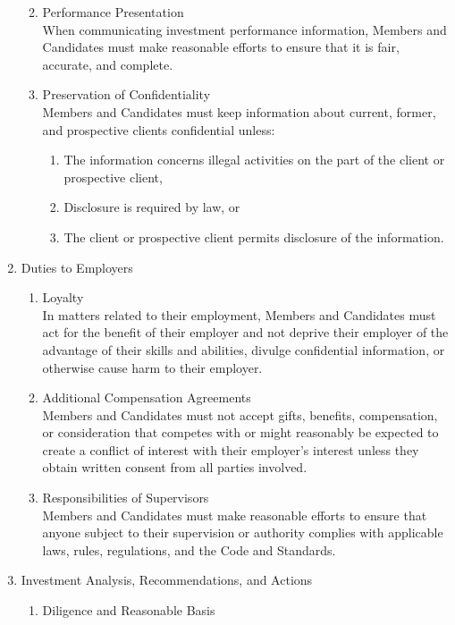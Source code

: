 \begin{definition}
\begin{enumerate}[label=\Roman*.]
\begin{enumerate}[label=\Alph*.]
\begin{enumerate}[label=\arabic*.]
\end{enumerate}
\item Performance Presentation\\
When communicating investment performance information, Members and Candidates must make reasonable efforts to ensure that it is fair, accurate, and complete.
\item Preservation of Confidentiality\\
Members and Candidates must keep information about current, former, and prospective clients confidential unless:
\begin{enumerate}[label=\arabic*.]
\setlength{\itemsep}{0pt}
\item The information concerns illegal activities on the part of the client or prospective client,
\item Disclosure is required by law, or
\item The client or prospective client permits disclosure of the information.
\end{enumerate}
\end{enumerate}
\item Duties to Employers
\begin{enumerate}[label=\Alph*.]
\setlength{\itemsep}{0pt}
\item Loyalty\\
In matters related to their employment, Members and Candidates must act for the benefit of their employer and not deprive their employer of the advantage of their skills and abilities, divulge confidential information, or otherwise cause harm to their employer.
\item Additional Compensation Agreements\\
Members and Candidates must not accept gifts, benefits, compensation, or consideration that competes with or might reasonably be expected to create a conflict of interest with their employer’s interest unless they obtain written consent from all parties involved.
\item Responsibilities of Supervisors\\
Members and Candidates must make reasonable efforts to ensure that anyone subject to their supervision or authority complies with applicable laws, rules, regulations, and the Code and Standards.
\end{enumerate}
\item Investment Analysis, Recommendations, and Actions
\begin{enumerate}[label=\Alph*.]
\setlength{\itemsep}{0pt}
\item Diligence and Reasonable Basis\\

\end{enumerate}
\end{enumerate}
\end{definition}

